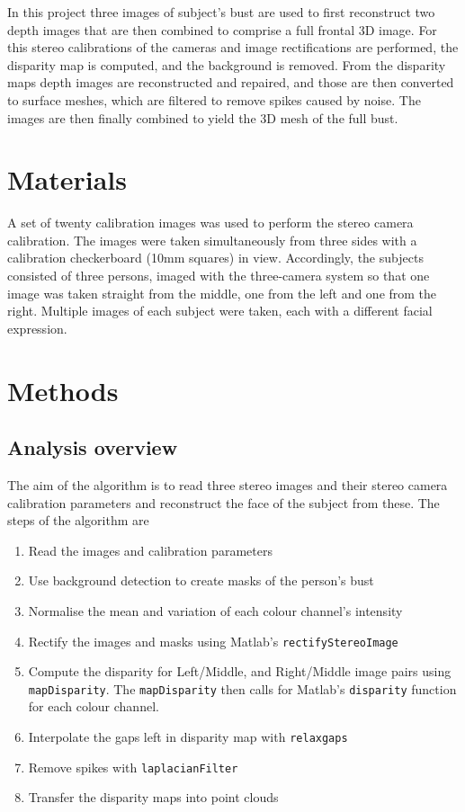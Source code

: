 \documentclass[journal]{IEEEtran}
\begin{document}
In this project three images of subject's bust are used to first reconstruct two depth images that are then combined to comprise a full frontal 3D image.
For this stereo calibrations of the cameras and image rectifications are performed, the disparity map is computed, and the background is removed.
From the disparity maps depth images are reconstructed and repaired, and those are then converted to surface meshes, which are filtered to remove spikes caused by noise.
The images are then finally combined to yield the 3D mesh of the full bust.


\section{Materials}
A set of twenty calibration images was used to perform the stereo camera calibration. 
The images were taken simultaneously from three sides with a calibration checkerboard (10mm squares) in view.
Accordingly, the subjects consisted of three persons, imaged with the three-camera system so that one image was taken straight from the middle, one from the left and one from the right. 
Multiple images of each subject were taken, each with a different facial expression.


\section{Methods}

\subsection{Analysis overview}

The aim of the algorithm is to read three stereo images and their stereo camera calibration parameters and reconstruct the face of the subject from these.
The steps of the algorithm are 

\begin{enumerate}
\item Read the images and calibration parameters
\item Use background detection to create masks of the person's bust
\item Normalise the mean and variation of each colour channel's intensity
\item Rectify the images and masks using Matlab's \texttt{rectifyStereoImage}
\item Compute the disparity for Left/Middle, and Right/Middle image pairs using \texttt{mapDisparity}. The \texttt{mapDisparity} then calls for Matlab's \texttt{disparity} function for each colour channel.
\item Interpolate the gaps left in disparity map with \texttt{relaxgaps}
\item Remove spikes with \texttt{laplacianFilter}
\item Transfer the disparity maps into point clouds

\end{enumerate}
\end{document}
